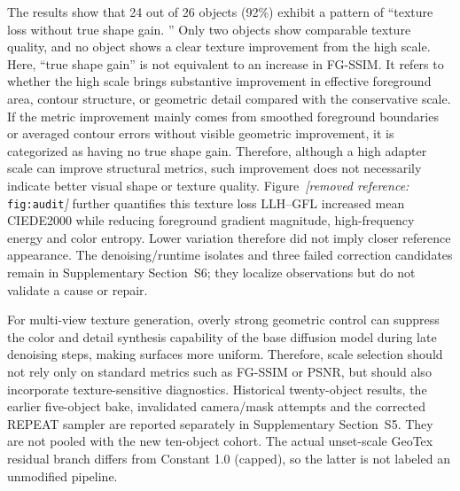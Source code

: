 \documentclass[times,twocolumn,final]{elsarticle}
\providecommand{\DIFadd}[1]{{\protect\color{blue} \sf #1}} %
\providecommand{\DIFdel}[1]{{\protect\color{red} \scriptsize #1}} %
\providecommand{\DIFaddbegin}{} %
\providecommand{\DIFaddend}{} %
\providecommand{\DIFdelbegin}{} %
\providecommand{\DIFdelend}{} %
\begin{document}
\DIFdel{The results show that 24 out of 26 objects (92\%) exhibit a pattern of ``texture loss without true shape gain.
'' Only two objects show comparable texture quality, and no object shows a clear texture improvement from the high scale. Here, ``true shape gain'' is not equivalent to an increase in FG-SSIM. It refers to whether the high scale brings substantive improvement in effective foreground area, contour structure, or geometric detail compared with the conservative scale. If the metric improvement mainly comes from smoothed foreground boundaries or averaged contour errors without visible geometric improvement, it is categorized as having no true shape gain. Therefore, although a high adapter scale can improve structural metrics, such improvement does not necessarily indicate better visual shape or texture quality. Figure~\textit{[removed reference: }\texttt{fig:audit}\textit{]} further quantifies this texture loss}\DIFdelend \DIFaddbegin \DIFadd{LLH--GFL increased mean CIEDE2000 while reducing foreground gradient magnitude, high-frequency energy and color entropy. Lower variation therefore did not imply closer reference appearance. The denoising/runtime isolates and three failed correction candidates remain in Supplementary Section~S6; they localize observations but do not validate a cause or repair}\DIFaddend .

\DIFdelbegin %

\DIFdel{For multi-view texture generation, overly strong geometric control can suppress the color and detail synthesis capability of the base diffusion model during late denoising steps, making surfaces more uniform. Therefore, scale selection should not rely only on standard metrics such as FG-SSIM or PSNR, but should also incorporate texture-sensitive diagnostics. }\DIFdelend \DIFaddbegin \DIFadd{Historical twenty-object results, the earlier five-object bake, invalidated camera/mask attempts and the corrected REPEAT sampler are reported separately in Supplementary Section~S5. They are not pooled with the new ten-object cohort. The actual unset-scale GeoTex residual branch differs from Constant 1.0 (capped), so the latter is not labeled an unmodified pipeline.
}\DIFaddend 
\end{document}
